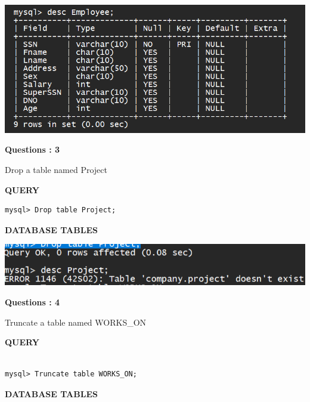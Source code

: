 \documentclass[a4paper,12pt]{report}
\begin{document}
\includegraphics[scale=0.7]{alterempl.png}
\begin{flushleft}
    \textbf{Questions : 3}
\end{flushleft}
Drop a table named Project
\begin{flushleft}
		\textbf{QUERY }
	\end{flushleft}
\begin{verbatim}
mysql> Drop table Project;

\end{verbatim}

\begin{flushleft}
		\textbf{DATABASE TABLES}
\end{flushleft} 

\includegraphics[scale=0.8]{Screenshot (454).png}
	
\begin{flushleft}
    \textbf{Questions : 4}
\end{flushleft}
Truncate a table named WORKS\_ON
\begin{flushleft}
		\textbf{QUERY }
	\end{flushleft}
\begin{verbatim}

mysql> Truncate table WORKS_ON;

\end{verbatim}

\begin{flushleft}
		\textbf{DATABASE TABLES}
\end{flushleft} 
\end{document}
